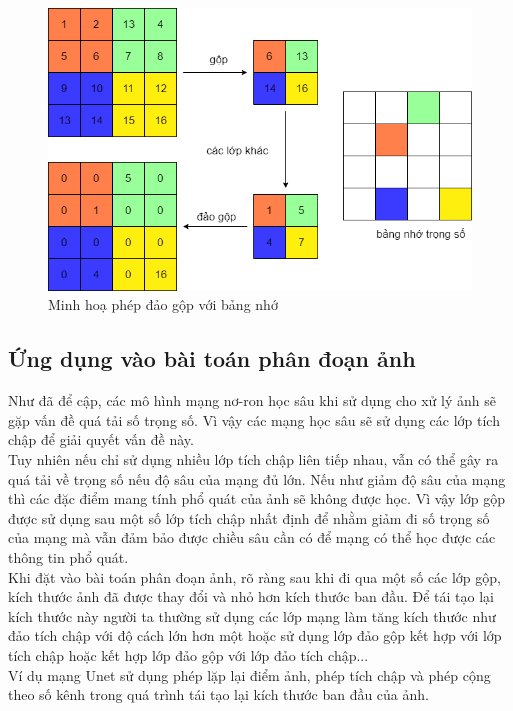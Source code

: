 \begin{figure}[h]
\centering
    \includegraphics[totalheight=7.5cm]{Images/unpool.png}
    \caption{Minh hoạ phép đảo gộp với bảng nhớ}
    \label{unpoolExample}
\end{figure}

\subsection{Ứng dụng vào bài toán phân đoạn ảnh}
Như đã để cập, các mô hình mạng nơ-ron học sâu khi sử dụng cho xử lý ảnh sẽ gặp vấn đề quá tải số trọng số. Vì vậy các mạng học sâu sẽ sử dụng các lớp tích chập để giải quyết vấn đề này.\\
Tuy nhiên nếu chỉ sử dụng nhiều lớp tích chập liên tiếp nhau, vẫn có thể gây ra quá tải về trọng số nếu độ sâu của mạng đủ lớn. Nếu như giảm độ sâu của mạng thì các đặc điểm mang tính phổ quát của ảnh sẽ không được học. Vì vậy lớp gộp được sử dụng sau một số lớp tích chập nhất định để nhằm giảm đi số trọng số của mạng mà vẫn đảm bảo được chiều sâu cần có để mạng có thể học được các thông tin phổ quát.\\
Khi đặt vào bài toán phân đoạn ảnh, rõ ràng sau khi đi qua một số các lớp gộp, kích thước ảnh đã được thay đổi và nhỏ hơn kích thước ban đầu. Để tái tạo lại kích thước này người ta thường sử dụng các lớp mạng làm tăng kích thước như đảo tích chập với độ cách lớn hơn một hoặc sử dụng lớp đảo gộp kết hợp với lớp tích chập hoặc kết hợp lớp đảo gộp với lớp đảo tích chập...\\
Ví dụ mạng Unet sử dụng phép lặp lại điểm ảnh, phép tích chập và phép cộng theo số kênh trong quá trình tái tạo lại kích thước ban đầu của ảnh.

